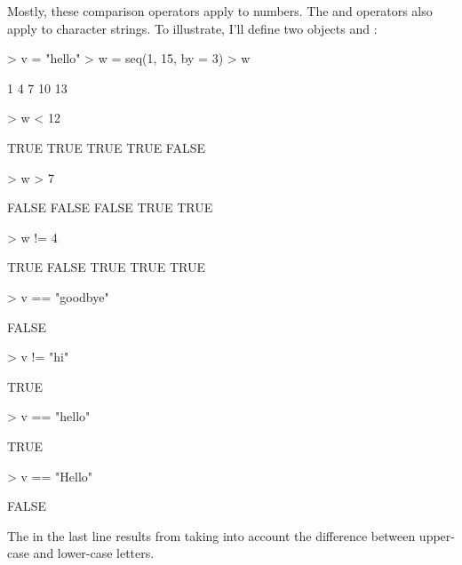 Mostly, these comparison operators apply to numbers.  The \code{==}
and \code{!=} operators also apply to character strings.  To
illustrate, I'll define two objects  and :
\begin{Schunk}
\begin{Sinput}
> v = "hello"
> w = seq(1, 15, by = 3)
> w
\end{Sinput}
\begin{Soutput}
[1]  1  4  7 10 13
\end{Soutput}
\begin{Sinput}
> w < 12
\end{Sinput}
\begin{Soutput}
[1]  TRUE  TRUE  TRUE  TRUE FALSE
\end{Soutput}
\begin{Sinput}
> w > 7
\end{Sinput}
\begin{Soutput}
[1] FALSE FALSE FALSE  TRUE  TRUE
\end{Soutput}
\begin{Sinput}
> w != 4
\end{Sinput}
\begin{Soutput}
[1]  TRUE FALSE  TRUE  TRUE  TRUE
\end{Soutput}
\begin{Sinput}
> v == "goodbye"
\end{Sinput}
\begin{Soutput}
[1] FALSE
\end{Soutput}
\begin{Sinput}
> v != "hi"
\end{Sinput}
\begin{Soutput}
[1] TRUE
\end{Soutput}
\begin{Sinput}
> v == "hello"
\end{Sinput}
\begin{Soutput}
[1] TRUE
\end{Soutput}
\begin{Sinput}
> v == "Hello"
\end{Sinput}
\begin{Soutput}
[1] FALSE
\end{Soutput}
\end{Schunk}
The  in the last line results from taking into account the
difference between upper-case and lower-case letters.




